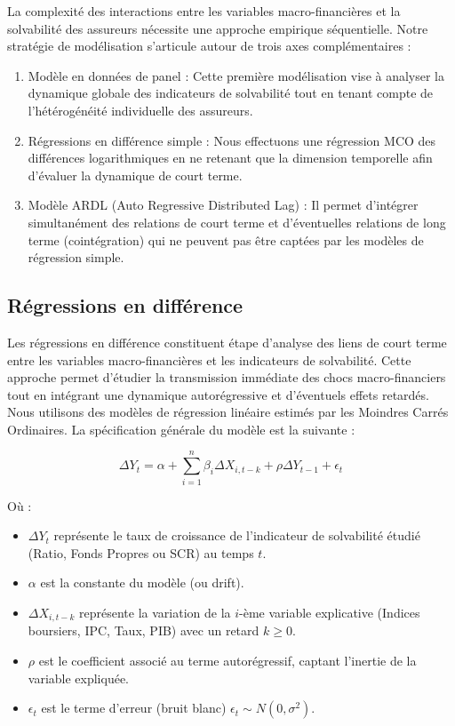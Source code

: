 \documentclass[
]{article}
\begin{document}
La complexité des interactions entre les variables macro-financières et
la solvabilité des assureurs nécessite une approche empirique
séquentielle. Notre stratégie de modélisation s'articule autour de trois
axes complémentaires :

\begin{enumerate}
  \item \textbf{}Modèle en données de panel : Cette première modélisation vise à analyser la dynamique globale des indicateurs de solvabilité tout en tenant compte de l'hétérogénéité individuelle des assureurs.
  \item \textbf{}Régressions en différence simple : Nous effectuons une régression MCO des différences logarithmiques en ne retenant que la dimension temporelle afin d'évaluer la dynamique de court terme.
  \item \textbf{}Modèle ARDL (Auto Regressive Distributed Lag) : Il permet d'intégrer simultanément des relations de court terme et d'éventuelles relations de long terme (cointégration) qui ne peuvent pas être captées par les modèles de régression simple.
\end{enumerate}

\subsection{Régressions en
différence}\label{ruxe9gressions-en-diffuxe9rence}

Les régressions en différence constituent étape d'analyse des liens de
court terme entre les variables macro-financières et les indicateurs de
solvabilité. Cette approche permet d'étudier la transmission immédiate
des chocs macro-financiers tout en intégrant une dynamique
autorégressive et d'éventuels effets retardés. Nous utilisons des
modèles de régression linéaire estimés par les Moindres Carrés
Ordinaires. La spécification générale du modèle est la suivante :

\begin{equation}
\Delta Y_t = \alpha + \sum_{i=1}^{n} \beta_i \Delta X_{i, t-k} + \rho \Delta Y_{t-1} + \epsilon_t
\end{equation}

Où :

\begin{itemize}
    \item $\Delta Y_t$ représente le taux de croissance de l'indicateur de solvabilité étudié (Ratio, Fonds Propres ou SCR) au temps $t$.
    \item $\alpha$ est la constante du modèle (ou drift).
    \item $\Delta X_{i, t-k}$ représente la variation de la $i$-ème variable explicative (Indices boursiers, IPC, Taux, PIB) avec un retard $k \geq 0$.
    \item $\rho$ est le coefficient associé au terme autorégressif, captant l'inertie de la variable expliquée.
    \item $\epsilon_t$ est le terme d'erreur (bruit blanc) $\epsilon_t \sim N(0, \sigma^2)$.
\end{itemize}
\end{document}
